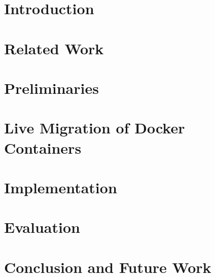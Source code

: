\documentclass[sigconf]{acmart}
\begin{document}


\begin{abstract}

\end{abstract}





\maketitle

% 

\section{Introduction}


\section{Related Work}



\section{Preliminaries}



\section{Live Migration of Docker Containers}



\section{Implementation}



\section{Evaluation}




\section{Conclusion and Future Work}



 
 
\end{document}
